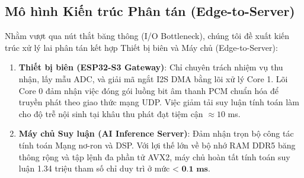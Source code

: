 \subsection{Mô hình Kiến trúc Phân tán (Edge-to-Server)}
Nhằm vượt qua nút thắt băng thông (I/O Bottleneck), chúng tôi đề xuất kiến trúc xử lý lai phân tán kết hợp Thiết bị biên và Máy chủ (Edge-to-Server):
\begin{enumerate}
    \item \textbf{Thiết bị biên (ESP32-S3 Gateway)}: Chỉ chuyên trách nhiệm vụ thu nhận, lấy mẫu ADC, và giải mã ngắt I2S DMA bằng lõi xử lý Core 1. Lõi Core 0 đảm nhận việc đóng gói luồng bit âm thanh PCM chuẩn hóa để truyền phát theo giao thức mạng UDP. Việc giảm tải suy luận tính toán làm cho độ trễ nội sinh tại khâu thu phát đạt tiệm cận $\approx 10$ ms.
    \item \textbf{Máy chủ Suy luận (AI Inference Server)}: Đảm nhận trọn bộ công tác tính toán Mạng nơ-ron và DSP. Với lợi thế lớn về bộ nhớ RAM DDR5 băng thông rộng và tập lệnh đa phần tử AVX2, máy chủ hoàn tất tính toán suy luận 1.34 triệu tham số chỉ duy trì ở mức $\textbf{< 0.1 ms}$.
\end{enumerate}

